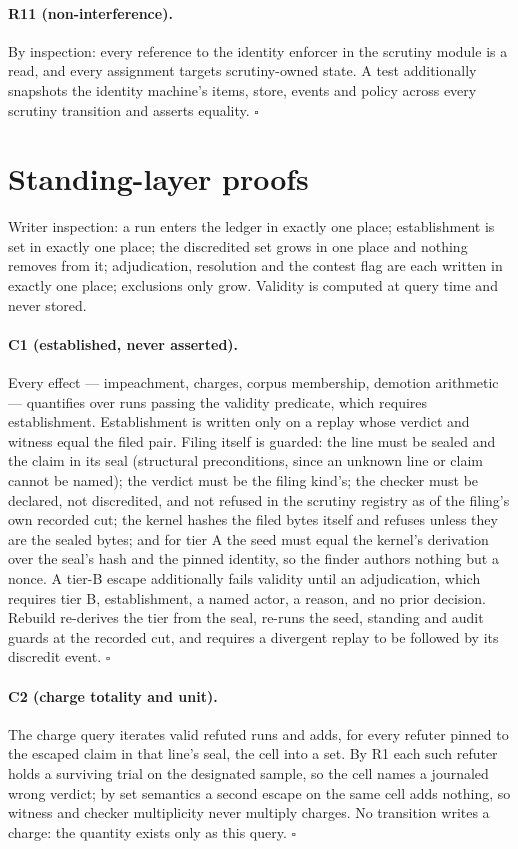 \documentclass[11pt,a4paper]{article}
\theoremstyle{plain}
\theoremstyle{definition}
\theoremstyle{remark}
\begin{document}
\paragraph{R11 (non-interference).} By inspection: every reference to the identity enforcer in the scrutiny module is a read, and every assignment targets scrutiny-owned state. A test additionally snapshots the identity machine's items, store, events and policy across every scrutiny transition and asserts equality. $\square$

\section{Standing-layer proofs}
\label{app:standing}

Writer inspection: a run enters the ledger in exactly one place; establishment is set in exactly one place; the discredited set grows in one place and nothing removes from it; adjudication, resolution and the contest flag are each written in exactly one place; exclusions only grow. Validity is computed at query time and never stored.

\paragraph{C1 (established, never asserted).} Every effect --- impeachment, charges, corpus membership, demotion arithmetic --- quantifies over runs passing the validity predicate, which requires establishment. Establishment is written only on a replay whose verdict and witness equal the filed pair. Filing itself is guarded: the line must be sealed and the claim in its seal (structural preconditions, since an unknown line or claim cannot be named); the verdict must be the filing kind's; the checker must be declared, not discredited, and not refused in the scrutiny registry as of the filing's own recorded cut; the kernel hashes the filed bytes itself and refuses unless they are the sealed bytes; and for tier A the seed must equal the kernel's derivation over the seal's hash and the pinned identity, so the finder authors nothing but a nonce. A tier-B escape additionally fails validity until an adjudication, which requires tier B, establishment, a named actor, a reason, and no prior decision. Rebuild re-derives the tier from the seal, re-runs the seed, standing and audit guards at the recorded cut, and requires a divergent replay to be followed by its discredit event. $\square$

\paragraph{C2 (charge totality and unit).} The charge query iterates valid refuted runs and adds, for every refuter pinned to the escaped claim in that line's seal, the cell into a set. By R1 each such refuter holds a surviving trial on the designated sample, so the cell names a journaled wrong verdict; by set semantics a second escape on the same cell adds nothing, so witness and checker multiplicity never multiply charges. No transition writes a charge: the quantity exists only as this query. $\square$
\end{document}
